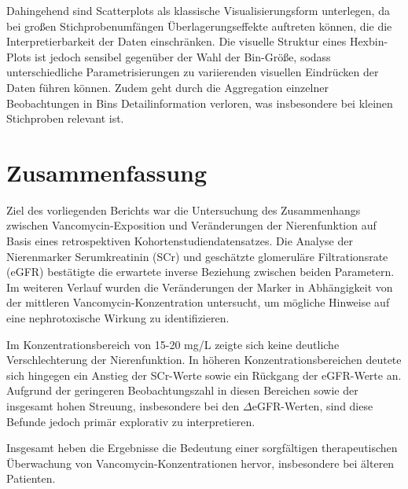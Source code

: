 \documentclass[a4paper,12pt]{article}
\begin{document}
Dahingehend sind Scatterplots als klassische Visualisierungsform unterlegen, da bei großen Stichprobenumfängen Überlagerungseffekte auftreten können, die die Interpretierbarkeit der Daten einschränken. Die visuelle Struktur eines Hexbin-Plots ist jedoch sensibel gegenüber der Wahl der Bin-Größe, sodass unterschiedliche Parametrisierungen zu variierenden visuellen Eindrücken der Daten führen können. Zudem geht durch die Aggregation einzelner Beobachtungen in Bins Detailinformation verloren, was insbesondere bei kleinen Stichproben relevant ist. 


\section{Zusammenfassung}
Ziel des vorliegenden Berichts war die Untersuchung des Zusammenhangs zwischen Vancomycin-Exposition und Veränderungen der Nierenfunktion auf Basis eines retrospektiven Kohortenstudiendatensatzes. Die Analyse der Nierenmarker Serumkreatinin (SCr) und geschätzte glomeruläre Filtrationsrate (eGFR) bestätigte die erwartete inverse Beziehung zwischen beiden Parametern. Im weiteren Verlauf wurden die Veränderungen der Marker in Abhängigkeit von der mittleren Vancomycin-Konzentration untersucht, um mögliche Hinweise auf eine nephrotoxische Wirkung zu identifizieren. 

Im Konzentrationsbereich von 15-20 mg/L zeigte sich keine deutliche Verschlechterung der Nierenfunktion. In höheren Konzentrationsbereichen deutete sich hingegen ein Anstieg der SCr-Werte sowie ein Rückgang der eGFR-Werte an. Aufgrund der geringeren Beobachtungszahl in diesen Bereichen sowie der insgesamt hohen Streuung, insbesondere bei den $\Delta$eGFR-Werten, sind diese Befunde jedoch primär explorativ zu interpretieren. 

Insgesamt heben die Ergebnisse die Bedeutung einer sorgfältigen therapeutischen Überwachung von Vancomycin-Konzentrationen hervor, insbesondere bei älteren Patienten.


\newpage
{}
\renewcommand{\refname}{Literaturverzeichnis}




\newpage
\appendix
{}
\end{document}
